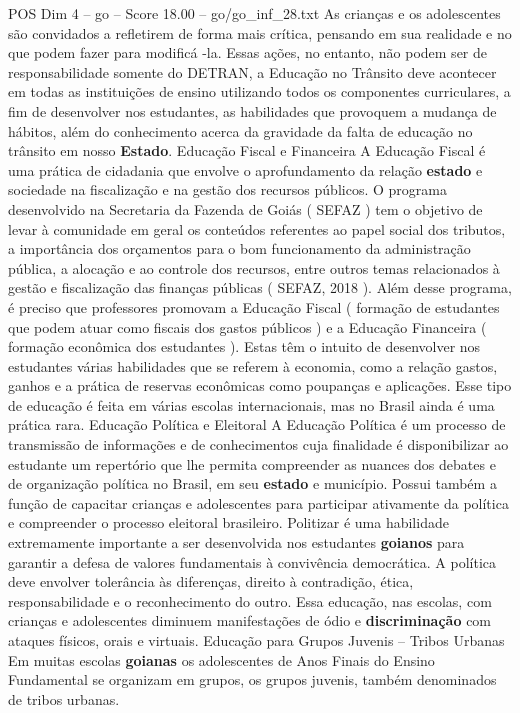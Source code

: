\begin{textsample}{POS Dim 4 – go – Score 18.00 – go/go\_inf\_28.txt}
As crianças e os adolescentes são convidados a refletirem de forma mais crítica, pensando em sua realidade e no que podem fazer para modificá -la.
Essas ações, no entanto, não podem ser de responsabilidade somente do DETRAN, a Educação no Trânsito deve acontecer em todas as instituições de ensino utilizando todos os componentes curriculares, a fim de desenvolver nos estudantes, as habilidades que provoquem a mudança de hábitos, além do conhecimento acerca da gravidade da falta de educação no trânsito em nosso \textbf{Estado}.
Educação Fiscal e Financeira A Educação Fiscal é uma prática de cidadania que envolve o aprofundamento da relação \textbf{estado} e sociedade na fiscalização e na gestão dos recursos públicos.
O programa desenvolvido na Secretaria da Fazenda de Goiás ( SEFAZ ) tem o objetivo de levar à comunidade em geral os conteúdos referentes ao papel social dos tributos, a importância dos orçamentos para o bom funcionamento da administração pública, a alocação e ao controle dos recursos, entre outros temas relacionados à gestão e fiscalização das finanças públicas ( SEFAZ, 2018 ).
Além desse programa, é preciso que professores promovam a Educação Fiscal ( formação de estudantes que podem atuar como fiscais dos gastos públicos ) e a Educação Financeira ( formação econômica dos estudantes ).
Estas têm o intuito de desenvolver nos estudantes várias habilidades que se referem à economia, como a relação gastos, ganhos e a prática de reservas econômicas como poupanças e aplicações.
Esse tipo de educação é feita em várias escolas internacionais, mas no Brasil ainda é uma prática rara.
Educação Política e Eleitoral A Educação Política é um processo de transmissão de informações e de conhecimentos cuja finalidade é disponibilizar ao estudante um repertório que lhe permita compreender as nuances dos debates e de organização política no Brasil, em seu \textbf{estado} e município.
Possui também a função de capacitar crianças e adolescentes para participar ativamente da política e compreender o processo eleitoral brasileiro.
Politizar é uma habilidade extremamente importante a ser desenvolvida nos estudantes \textbf{goianos} para garantir a defesa de valores fundamentais à convivência democrática.
A política deve envolver tolerância às diferenças, direito à contradição, ética, responsabilidade e o reconhecimento do outro.
Essa educação, nas escolas, com crianças e adolescentes diminuem manifestações de ódio e \textbf{discriminação} com ataques físicos, orais e virtuais.
Educação para Grupos Juvenis – Tribos Urbanas Em muitas escolas \textbf{goianas} os adolescentes de Anos Finais do Ensino Fundamental se organizam em grupos, os grupos juvenis, também denominados de tribos urbanas.

\end{textsample}
